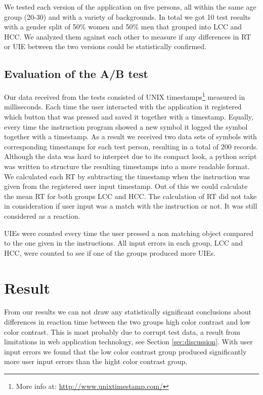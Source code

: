 \documentclass[runningheads,a4paper]{llncs}
\begin{document}
We tested each version of the application on five persons, all within the same age group (20-30) and with a variety of backgrounds. In total we got 10 test results with a gender split of 50\% women and 50\% men that grouped into LCC and HCC. We analyzed them against each other to measure if any differences in RT or UIE between the two versions could be statistically confirmed.

\subsection{Evaluation of the A/B test}
Our data received from the tests consisted of UNIX timestamps\footnote{More info at: \url{http://www.unixtimestamp.com/}} measured in milliseconds. Each time the user interacted with the application it registered which button that was pressed and saved it together with a timestamp. Equally, every time the instruction program showed a new symbol it logged the symbol together with a timestamp. As a result we received two data sets of symbols with corresponding timestamps for each test person, resulting in a total of 200 records. Although the data was hard to interpret due to its compact look, a python script was written to structure the resulting timestamps into a more readable format. We calculated each RT by subtracting the timestamp when the instruction was given from the registered user input timestamp. Out of this we could calculate the mean RT for both groups LCC and HCC. The calculation of RT did not take in consideration if user input was a match with the instruction or not. It was still considered as a reaction.

UIEs were counted every time the user pressed a non matching object compared to the one given in the instructions. All input errors in each group, LCC and HCC, were counted to see if one of the groups produced more UIEs.

\section{Result}
From our results we can not draw any statistically significant conclusions about differences in reaction time between the two groups high color contrast and low color contrast. This is most probably due to corrupt test data, a result from limitations in web application technology, see Section \ref{sec:discussion}. With user input errors we found that the low color contrast group produced significantly more user input errors than the hight color contrast group.
\end{document}
